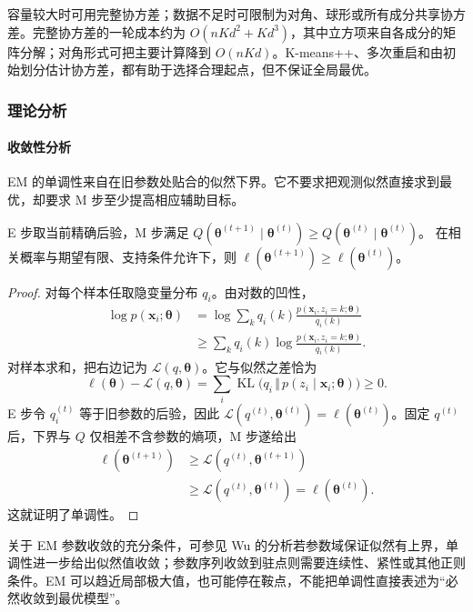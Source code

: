 容量较大时可用完整协方差；数据不足时可限制为对角、球形或所有成分共享协方差。完整协方差的一轮成本约为 $O(nKd^2+Kd^3)$，其中立方项来自各成分的矩阵分解；对角形式可把主要计算降到 $O(nKd)$。K-means++、多次重启和由初始划分估计协方差，都有助于选择合理起点，但不保证全局最优。

\subsubsection{理论分析}

\paragraph{收敛性分析}
EM 的单调性来自在旧参数处贴合的似然下界。它不要求把观测似然直接求到最优，却要求 M 步至少提高相应辅助目标。

\begin{theorem}[EM 的似然单调性]
 \label{thm:clustering-em}
 E 步取当前精确后验，M 步满足
 $Q(\bm{\theta}^{(t+1)}\mid\bm{\theta}^{(t)})
 \geq Q(\bm{\theta}^{(t)}\mid\bm{\theta}^{(t)})$。
 在相关概率与期望有限、支持条件允许下，则
 $\ell(\bm{\theta}^{(t+1)})\geq\ell(\bm{\theta}^{(t)})$。
\end{theorem}
\begin{proof}
对每个样本任取隐变量分布 $q_i$。由对数的凹性，
\[
 \begin{aligned}
 \log p(\bm{x}_i;\bm{\theta})
 &=\log\sum_k q_i(k)
   \frac{p(\bm{x}_i,z_i=k;\bm{\theta})}{q_i(k)}\\
 &\geq\sum_kq_i(k)
   \log\frac{p(\bm{x}_i,z_i=k;\bm{\theta})}{q_i(k)}.
 \end{aligned}
\]
对样本求和，把右边记为 $\mathcal{L}(q,\bm{\theta})$。它与似然之差恰为
\[
 \ell(\bm{\theta})-\mathcal{L}(q,\bm{\theta})
 =\sum_i\operatorname{KL}
 \bigl(q_i\,\Vert\,p(z_i\mid\bm{x}_i;\bm{\theta})\bigr)
 \geq0.
\]
E 步令 $q_i^{(t)}$ 等于旧参数的后验，因此 $\mathcal{L}(q^{(t)},\bm{\theta}^{(t)})=\ell(\bm{\theta}^{(t)})$。固定 $q^{(t)}$ 后，下界与 $Q$ 仅相差不含参数的熵项，M 步遂给出
\[
 \begin{aligned}
 \ell(\bm{\theta}^{(t+1)})
 &\geq\mathcal{L}(q^{(t)},\bm{\theta}^{(t+1)})\\
 &\geq\mathcal{L}(q^{(t)},\bm{\theta}^{(t)})
 =\ell(\bm{\theta}^{(t)}).
 \end{aligned}
\]
这就证明了单调性。
\end{proof}

关于 EM 参数收敛的充分条件，可参见 Wu 的分析若参数域保证似然有上界，单调性进一步给出似然值收敛；参数序列收敛到驻点则需要连续性、紧性或其他正则条件。EM 可以趋近局部极大值，也可能停在鞍点，不能把单调性直接表述为“必然收敛到最优模型”。


